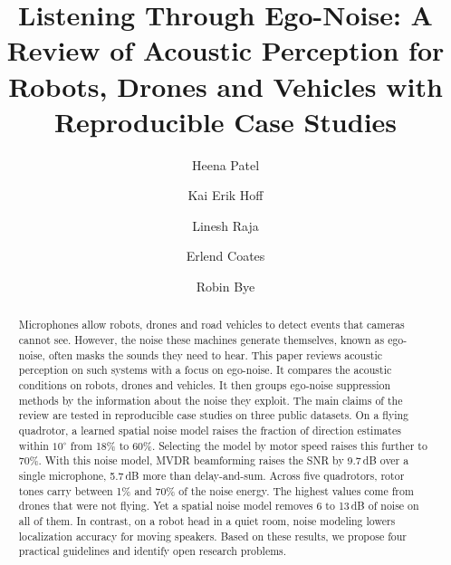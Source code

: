 \documentclass{svproc}
\begin{document}
\renewcommand{\topfraction}{0.9}       %
\renewcommand{\textfraction}{0.1}      %
\mainmatter              %
%
\title{Listening Through Ego-Noise: A Review of Acoustic Perception for Robots, Drones and Vehicles with Reproducible Case Studies}
%
%
\author{Heena Patel\and Kai Erik Hoff \and Linesh Raja \and
        Erlend Coates \and  Robin Bye}
%
%
%
\maketitle              %

\begin{abstract}
Microphones allow robots, drones and road vehicles to detect events that cameras cannot see. However, the noise these machines generate themselves, known as ego-noise, often masks the sounds they need to hear. This paper reviews acoustic perception on such systems with a focus on ego-noise. It compares the acoustic conditions on robots, drones and vehicles. It then groups ego-noise suppression methods by the information about the noise they exploit. The main claims of the review are tested in reproducible case studies on three public datasets.
On a flying quadrotor, a learned spatial noise model raises the fraction of direction estimates within $10^\circ$ from 18\% to 60\%. Selecting the model by motor speed raises this further to 70\%. With this noise model, MVDR beamforming raises the SNR by 9.7\,dB over a single microphone, 5.7\,dB more than delay-and-sum.
Across five quadrotors, rotor tones carry between 1\% and 70\% of the noise energy. The highest values come from drones that were not flying. Yet a spatial noise model removes 6 to 13\,dB of noise on all of them.
In contrast, on a robot head in a quiet room, noise modeling lowers localization accuracy for moving speakers.
Based on these results, we propose four practical guidelines and identify open research problems.
\end{abstract}
\end{document}
